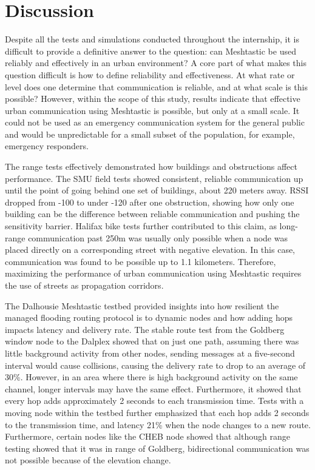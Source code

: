 \documentclass[11pt]{article}
\begin{document}
\FloatBarrier
\section{Discussion}

Despite all the tests and simulations conducted throughout the internship, it is difficult to provide a definitive answer to the question: can Meshtastic be used reliably and effectively in an urban environment? A core part of what makes this question difficult is how to define reliability and effectiveness. At what rate or level does one determine that communication is reliable, and at what scale is this possible? However, within the scope of this study, results indicate that effective urban communication using Meshtastic is possible, but only at a small scale. It could not be used as an emergency communication system for the general public and would be unpredictable for a small subset of the population, for example, emergency responders.
	
The range tests effectively demonstrated how buildings and obstructions affect performance. The SMU field tests showed consistent, reliable communication up until the point of going behind one set of buildings, about 220 meters away. RSSI dropped from -100 to under -120 after one obstruction, showing how only one building can be the difference between reliable communication and pushing the sensitivity barrier. Halifax bike tests further contributed to this claim, as long-range communication past 250m was usually only possible when a node was placed directly on a corresponding street with negative elevation. In this case, communication was found to be possible up to 1.1 kilometers. Therefore, maximizing the performance of urban communication using Meshtastic requires the use of streets as propagation corridors.

The Dalhousie Meshtastic testbed provided insights into how resilient the managed flooding routing protocol is to dynamic nodes and how adding hops impacts latency and delivery rate. The stable route test from the Goldberg window node to the Dalplex showed that on just one path, assuming there was little background activity from other nodes, sending messages at a five-second interval would cause collisions, causing the delivery rate to drop to an average of 30\%. However, in an area where there is high background activity on the same channel, longer intervals may have the same effect. Furthermore, it showed that every hop adds approximately 2 seconds to each transmission time. Tests with a moving node within the testbed further emphasized that each hop adds 2 seconds to the transmission time, and latency 21\% when the node changes to a new route. Furthermore, certain nodes like the CHEB node showed that although range testing showed that it was in range of Goldberg, bidirectional communication was not possible because of the elevation change.
\end{document}
